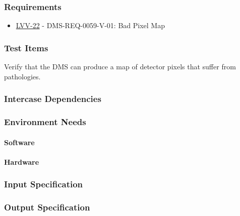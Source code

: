\subsubsection{Requirements}
\begin{itemize}
\item \href{https://jira.lsstcorp.org/browse/LVV-22}{LVV-22} - DMS-REQ-0059-V-01: Bad Pixel Map
\end{itemize}

\subsubsection{Test Items}
Verify that the DMS can produce a map of detector pixels that suffer
from pathologies.



\subsubsection{Intercase Dependencies}

\subsubsection{Environment Needs}

\paragraph{Software}

\paragraph{Hardware}

\subsubsection{Input Specification}

\subsubsection{Output Specification}

